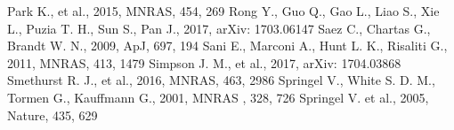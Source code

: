 \documentclass[useAMS,usenatbib]{mn2e}
\begin{document}
\begin{thebibliography}{}
 Park K., et al., 2015, MNRAS, 454, 269
 Rong Y., Guo Q., Gao L., Liao S., Xie L., Puzia T. H., Sun S., Pan J., 2017, arXiv: 1703.06147
 Saez C., Chartas G., Brandt W. N., 2009, ApJ, 697, 194
 Sani E., Marconi A., Hunt L. K., Risaliti G., 2011, MNRAS, 413, 1479
 Simpson J. M., et al., 2017, arXiv: 1704.03868
 Smethurst R. J., et al., 2016, MNRAS, 463, 2986
 Springel V., White S. D. M., Tormen G., Kauffmann G., 2001, MNRAS , 328, 726
 Springel V. et al., 2005, Nature, 435, 629

\end{thebibliography}
\end{document}

